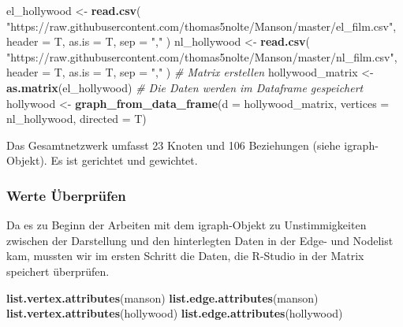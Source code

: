 \documentclass[
]{article}
\newenvironment{Shaded}{\begin{snugshade}}{\end{snugshade}}
\newcommand{\CommentTok}[1]{\textcolor[rgb]{0.56,0.35,0.01}{\textit{#1}}}
\newcommand{\DataTypeTok}[1]{\textcolor[rgb]{0.13,0.29,0.53}{#1}}
\newcommand{\KeywordTok}[1]{\textcolor[rgb]{0.13,0.29,0.53}{\textbf{#1}}}
\newcommand{\NormalTok}[1]{#1}
\newcommand{\StringTok}[1]{\textcolor[rgb]{0.31,0.60,0.02}{#1}}
\begin{document}
\begin{Shaded}
\begin{Highlighting}[]
\NormalTok{el_hollywood <-}
\StringTok{  }\KeywordTok{read.csv}\NormalTok{(}
    \StringTok{"https://raw.githubusercontent.com/thomas5nolte/Manson/master/el_film.csv"}\NormalTok{,}
    \DataTypeTok{header =}\NormalTok{ T,}
    \DataTypeTok{as.is =}\NormalTok{ T,}
    \DataTypeTok{sep =} \StringTok{","}
\NormalTok{  )}
\NormalTok{nl_hollywood <-}
\StringTok{  }\KeywordTok{read.csv}\NormalTok{(}
    \StringTok{"https://raw.githubusercontent.com/thomas5nolte/Manson/master/nl_film.csv"}\NormalTok{,}
    \DataTypeTok{header =}\NormalTok{ T,}
    \DataTypeTok{as.is =}\NormalTok{ T,}
    \DataTypeTok{sep =} \StringTok{","}
\NormalTok{  )}
\CommentTok{# Matrix erstellen}
\NormalTok{hollywood_matrix <-}\StringTok{ }\KeywordTok{as.matrix}\NormalTok{(el_hollywood)}
\CommentTok{# Die Daten werden im Dataframe gespeichert}
\NormalTok{hollywood <-}
\StringTok{  }\KeywordTok{graph_from_data_frame}\NormalTok{(}\DataTypeTok{d =}\NormalTok{ hollywood_matrix,}
                        \DataTypeTok{vertices =}\NormalTok{ nl_hollywood,}
                        \DataTypeTok{directed =}\NormalTok{ T)}
\end{Highlighting}
\end{Shaded}

Das Gesamtnetzwerk umfasst 23 Knoten und 106 Beziehungen (siehe
igraph-Objekt). Es ist gerichtet und gewichtet.

\hypertarget{werte-uxfcberpruxfcfen}{%
\subsubsection{Werte Überprüfen}\label{werte-uxfcberpruxfcfen}}

Da es zu Beginn der Arbeiten mit dem igraph-Objekt zu Unstimmigkeiten
zwischen der Darstellung und den hinterlegten Daten in der Edge- und
Nodelist kam, mussten wir im ersten Schritt die Daten, die R-Studio in
der Matrix speichert überprüfen.

\begin{Shaded}
\begin{Highlighting}[]
\KeywordTok{list.vertex.attributes}\NormalTok{(manson)}
\KeywordTok{list.edge.attributes}\NormalTok{(manson)}
\KeywordTok{list.vertex.attributes}\NormalTok{(hollywood)}
\KeywordTok{list.edge.attributes}\NormalTok{(hollywood)}
\end{Highlighting}
\end{Shaded}
\end{document}
